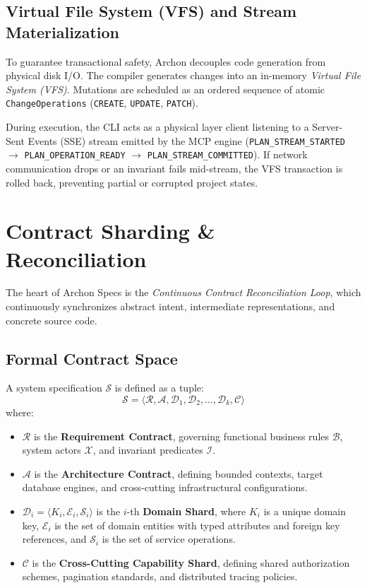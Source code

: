 \subsection{Virtual File System (VFS) and Stream Materialization}
To guarantee transactional safety, Archon decouples code generation from physical disk I/O. The compiler generates changes into an in-memory \emph{Virtual File System (VFS)}. Mutations are scheduled as an ordered sequence of atomic \texttt{ChangeOperations} (\texttt{CREATE}, \texttt{UPDATE}, \texttt{PATCH}). 

During execution, the CLI acts as a physical layer client listening to a Server-Sent Events (SSE) stream emitted by the MCP engine (\texttt{PLAN\_STREAM\_STARTED} $\to$ \texttt{PLAN\_OPERATION\_READY} $\to$ \texttt{PLAN\_STREAM\_COMMITTED}). If network communication drops or an invariant fails mid-stream, the VFS transaction is rolled back, preventing partial or corrupted project states.

\section{Contract Sharding \& Reconciliation}
\label{sec:reconciliation}

The heart of Archon Specs is the \emph{Continuous Contract Reconciliation Loop}, which continuously synchronizes abstract intent, intermediate representations, and concrete source code.

\subsection{Formal Contract Space}
\begin{definition}
A system specification $\mathcal{S}$ is defined as a tuple:
\begin{equation}
  \mathcal{S} = \langle \mathcal{R}, \mathcal{A}, \mathcal{D}_1, \mathcal{D}_2, \dots, \mathcal{D}_k, \mathcal{C} \rangle
\end{equation}
where:
\begin{itemize}[leftmargin=*]
  \item $\mathcal{R}$ is the \textbf{Requirement Contract}, governing functional business rules $\mathcal{B}$, system actors $\mathcal{X}$, and invariant predicates $\mathcal{I}$.
  \item $\mathcal{A}$ is the \textbf{Architecture Contract}, defining bounded contexts, target database engines, and cross-cutting infrastructural configurations.
  \item $\mathcal{D}_i = \langle K_i, \mathcal{E}_i, \mathcal{S}_i \rangle$ is the $i$-th \textbf{Domain Shard}, where $K_i$ is a unique domain key, $\mathcal{E}_i$ is the set of domain entities with typed attributes and foreign key references, and $\mathcal{S}_i$ is the set of service operations.
  \item $\mathcal{C}$ is the \textbf{Cross-Cutting Capability Shard}, defining shared authorization schemes, pagination standards, and distributed tracing policies.
\end{itemize}
\end{definition}

